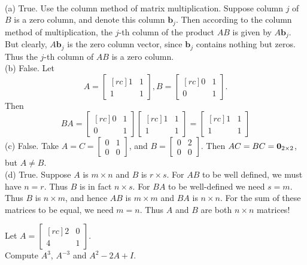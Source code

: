 \ee
\ \\
\begin{solution}
\noindent
(a) True. Use the column method of matrix multiplication. Suppose column $j$ of $B$ is a zero column, and denote this column $\mathbf{b}_j$. Then according to the column method of multiplication, the $j$-th column of the product $AB$ is given by $A\mathbf{b}_j$. But clearly, $A\mathbf{b}_j$ is the zero column vector, since $\mathbf{b}_j$ contains nothing but zeros. Thus the $j$-th column of $AB$ is a zero column.  
\\
(b) False. Let 
\[
A = 
\begin{bmatrix}[rc]
1&1\\
1&1
\end{bmatrix} 
, B = 
\begin{bmatrix}[rc]
0&1\\
0&1
\end{bmatrix} .
\]
Then 
\[
BA = \begin{bmatrix}[rc]
0&1\\
0&1
\end{bmatrix} 
\begin{bmatrix}[rc]
1&1\\
1&1
\end{bmatrix} 
=
\begin{bmatrix}[rc]
1&1\\
1&1
\end{bmatrix} 
\]
\noindent 
(c) False. Take $A=C=\begin{bmatrix}
0&1\\ 0&0
\end{bmatrix}$, and $B=\begin{bmatrix}
0&2\\ 0&0
\end{bmatrix}$. Then $AC=BC={\mathbf 0}_{2\times 2}$, but $A\ne B$. 
\\
(d) True. Suppose $A$ is $m\times n$ and $B$ is $r\times s$. For $AB$ to be well defined, we must have $n=r$. Thus $B$ is in fact $n\times s$. For $BA$ to be well-defined we need $s=m$. Thus $B$ is $n\times m$, and hence $AB$ is $m\times m$ and $BA$ is $n\times n$. For the sum of these matrices to be equal, we need $m=n$. Thus $A$ and $B$ are both $n\times n$ matrices! 
\end{solution}
\ii Let 
$
A = 
\begin{bmatrix}[rc]
2&0\\
4&1
\end{bmatrix}
$.
\\
Compute $A^3$, $A^{-3}$ and $A^2-2A+I$. 

